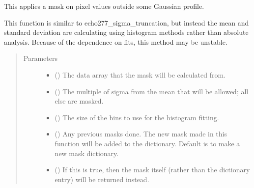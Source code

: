 \documentclass[letterpaper,10pt,english]{sphinxmanual}
\begin{document}
\begin{fulllineitems}
\label{\detokenize{python_docstrings/IfA_Smeargle.echo.masks.masks_echo100:IfA_Smeargle.echo.masks.masks_echo100.echo170_gaussian_truncation}}
This applies a mask on pixel values outside some Gaussian profile.

This function is similar to echo277\_sigma\_truncation, but instead the
mean and standard deviation are calculating using histogram methods
rather than absolute analysis. Because of the dependence on fits, this
method may be unstable.
\begin{quote}\begin{description}
\item[{Parameters}] \leavevmode\begin{itemize}
\item {} 
 () \textendash{} The data array that the mask will be calculated from.

\item {} 
 () \textendash{} The multiple of sigma from the mean that will be allowed; all else are
masked.

\item {} 
 () \textendash{} The size of the bins to use for the histogram fitting.

\item {} 
 (\sphinxstyleliteralemphasis{\sphinxupquote{ (}}\sphinxstyleliteralemphasis{\sphinxupquote{)}}) \textendash{} Any previous masks done. The new mask made in this function will be
added to the dictionary. Default is to make a new mask dictionary.

\item {} 
 (\sphinxstyleliteralemphasis{\sphinxupquote{ (}}\sphinxstyleliteralemphasis{\sphinxupquote{)}}) \textendash{} If this is true, then the mask itself (rather than the dictionary
entry) will be returned instead.


\end{itemize}
\end{description}
\end{quote}
\end{fulllineitems}
\end{document}
